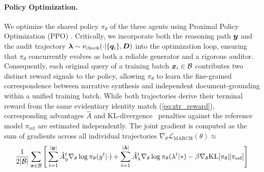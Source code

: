 \documentclass[10pt, a4paper, logo]{googledeepmind} %
\begin{document}
\paragraph{Policy Optimization.}
We optimize the shared policy $\pi_\theta$ of the three agents using Proximal Policy Optimization (PPO) \citep{schulman2017proximalpolicyoptimizationalgorithms}. 
Critically, we incorporate both the reasoning path ${\bm{y}}$ and the audit trajectory $\bm{\lambda} \sim \nu_\text{check}(\cdot|\{{\bm{q}}_i\}, {\bm{D}})$ into the optimization loop, ensuring that $\pi_\theta$ concurrently evolves as both a reliable generator and a rigorous auditor.
Consequently, each original query of a training batch ${\bm{x}}_i \in \mathcal{B}$ contributes two distinct reward signals to the policy, allowing $\pi_\theta$ to learn the fine-grained correspondence between narrative synthesis and independent document-grounding within a unified training batch. While both trajectories derive their terminal reward from the same evidentiary identity match (\eqref{eq:ztr_reward}), corresponding advantages $\hat{A}$ and KL-divergence~\citep{csiszar1975divergence} penalties against the reference model $\pi_\text{ref}$ are estimated independently. The joint gradient is computed as the sum of gradients across all individual trajectories $\nabla_\theta \mathcal{L}_{\text{MARCH}}(\theta) \approx$
%
\begin{align}\label{eq:expanded_gradient}
    \frac{1}{2|{\mathcal{B}}|} \sum_{{\bm{x}} \in \mathcal{B}} \Bigg[\sum_{t=1}^{|{\bm{y}}|} \hat{A}_{y}^t  \nabla_\theta \log \pi_\theta({y}^t | \cdot)  +\sum_{t=1}^{|\bm{\lambda}|} \hat{A}_{\lambda}^t   \nabla_\theta \log \pi_\theta({\lambda}^t | *)
    - \beta \nabla_\theta \text{KL}[\pi_\theta \| \pi_{\text{ref}}] \Bigg]
\end{align}
\end{document}
